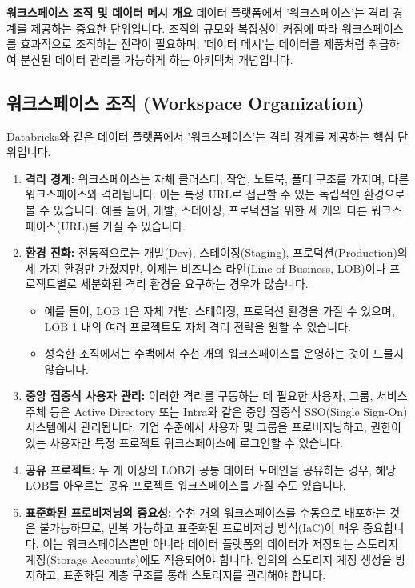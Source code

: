 \documentclass[11pt,a4paper]{article}
\begin{document}
\begin{conceptbox}
\textbf{워크스페이스 조직 및 데이터 메시 개요}
데이터 플랫폼에서 '워크스페이스'는 격리 경계를 제공하는 중요한 단위입니다. 조직의 규모와 복잡성이 커짐에 따라 워크스페이스를 효과적으로 조직하는 전략이 필요하며, '데이터 메시'는 데이터를 제품처럼 취급하여 분산된 데이터 관리를 가능하게 하는 아키텍처 개념입니다.
\end{conceptbox}

\subsection{워크스페이스 조직 (Workspace Organization)}
Databricks와 같은 데이터 플랫폼에서 '워크스페이스'는 격리 경계를 제공하는 핵심 단위입니다.

\begin{enumerate}
    \item \textbf{격리 경계:}
    워크스페이스는 자체 클러스터, 작업, 노트북, 폴더 구조를 가지며, 다른 워크스페이스와 격리됩니다. 이는 특정 URL로 접근할 수 있는 독립적인 환경으로 볼 수 있습니다. 예를 들어, 개발, 스테이징, 프로덕션을 위한 세 개의 다른 워크스페이스(URL)를 가질 수 있습니다.

    \item \textbf{환경 진화:}
    전통적으로는 개발(Dev), 스테이징(Staging), 프로덕션(Production)의 세 가지 환경만 가졌지만, 이제는 비즈니스 라인(Line of Business, LOB)이나 프로젝트별로 세분화된 격리 환경을 요구하는 경우가 많습니다.
    \begin{itemize}
        \item 예를 들어, LOB 1은 자체 개발, 스테이징, 프로덕션 환경을 가질 수 있으며, LOB 1 내의 여러 프로젝트도 자체 격리 전략을 원할 수 있습니다.
        \item 성숙한 조직에서는 수백에서 수천 개의 워크스페이스를 운영하는 것이 드물지 않습니다.
    \end{itemize}

    \item \textbf{중앙 집중식 사용자 관리:}
    이러한 격리를 구동하는 데 필요한 사용자, 그룹, 서비스 주체 등은 Active Directory 또는 Intra와 같은 중앙 집중식 SSO(Single Sign-On) 시스템에서 관리됩니다. 기업 수준에서 사용자 및 그룹을 프로비저닝하고, 권한이 있는 사용자만 특정 프로젝트 워크스페이스에 로그인할 수 있습니다.

    \item \textbf{공유 프로젝트:}
    두 개 이상의 LOB가 공통 데이터 도메인을 공유하는 경우, 해당 LOB를 아우르는 공유 프로젝트 워크스페이스를 가질 수도 있습니다.

    \item \textbf{표준화된 프로비저닝의 중요성:}
    수천 개의 워크스페이스를 수동으로 배포하는 것은 불가능하므로, 반복 가능하고 표준화된 프로비저닝 방식(IaC)이 매우 중요합니다. 이는 워크스페이스뿐만 아니라 데이터 플랫폼의 데이터가 저장되는 스토리지 계정(Storage Accounts)에도 적용되어야 합니다. 임의의 스토리지 계정 생성을 방지하고, 표준화된 계층 구조를 통해 스토리지를 관리해야 합니다.
\end{enumerate}
\end{document}
